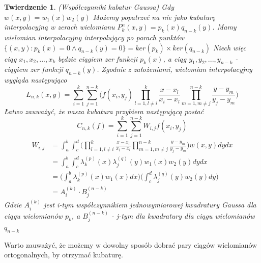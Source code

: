 \documentclass[10pt,wide]{mwart}
\newtheorem{tw}{Twierdzenie}
\theoremstyle{definition}
\begin{document}
\begin{tw} (Współczynniki kubatur Gaussa)
  Gdy \(w(x,y) = w_1(x)w_2(y)\)
  Możemy popatrzeć na nie jako kubaturę interpolacyjną w zerach wielomianu \(P_k^n(x,y) = p_k(x)q_{n-k}(y)\). Mamy wielomian interpolacyjny interpolujący po parach punktów \(\Big\{(x,y) : p_k(x) = 0 \wedge q_{n-k}(y) = 0\Big\} = ker(p_k) \times ker(q_{n-k})\)
  Niech więc ciąg \(x_1, x_2, ..., x_k\) będzie ciągiem zer funkcji \(p_k(x)\), a ciąg \(y_1, y_2, ..., y_{n-k}\) - ciągiem zer funkcji \(q_{n-k}(y)\).
  Zgodnie z założeniami, wielomian interpolacyjny wygląda następująco
  \begin{equation*}
    L_{n,k}(x,y) = \sum_{i=1}^{k}\sum_{j=1}^{n-k}\Big(f(x_i,y_j)\prod_{l = 1, l\neq i}^{k}\frac{x-x_l}{x_i - x_l} \prod_{m=1, m \neq j}^{n-k}\frac{y-y_m}{y_j - y_m}\Big)
  \end{equation*}
  Łatwo zauważyć, że nasza kubatura przybiera następującą postać
  \begin{equation*}
    C_{n,k}(f) = \sum_{i=1}^k\sum_{j=1}^{n-k}W_{i,j}f(x_i,y_j)
  \end{equation*}
  \begin{equation*}
  \begin{split}
    W_{i,j} & = \int_a^b \int_c^d \Big(\prod_{l = 1, l\neq i}^{k}\frac{x-x_l}{x_i - x_l} \prod_{m=1, m \neq j}^{n-k}\frac{y-y_m}{y_j - y_m}\Big) w(x,y)dy dx \\
    & = \int_a^b \int_c^d \lambda_k^{(p)}(x) \lambda_j^{(q)}(y) w_1(x)w_2(y) dydx \\
    & = \Big(\int_a^b \lambda_k^{(p)}(x) w_1(x) dx\Big)\Big( \int_c^d \lambda_j^{(q)}(y) w_2(y) dy\Big) \\
    & = A_i^{(k)}\cdot B_j^{(n-k)}
  \end{split}
\end{equation*}
  Gdzie \(A_i^{(k)}\) jest i-tym współczynnikiem jednowymiarowej kwadratury Gaussa dla ciągu wielomianów \(p_k\), a \(B_j^{(n-k)}\) - j-tym dla kwadratury dla ciągu wielomianów \(q_{n-k}\)
\end{tw}
Warto zauważyć, że możemy w dowolny sposób dobrać pary ciągów wielomianów ortogonalnych, by otrzymać kubaturę.
\end{document}
